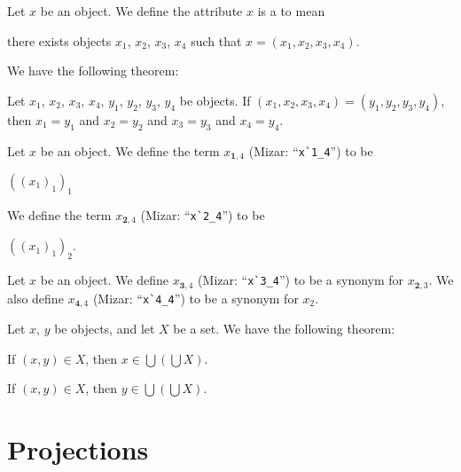 \documentclass{article}
\begin{document}
\begin{definition}
Let $x$ be an object. We define the attribute $x$ is a
 to mean
\begin{defn}
\item there exists objects $x_{1}$, $x_{2}$, $x_{3}$, $x_{4}$ such that $x=(x_{1},x_{2},x_{3},x_{4})$.
\end{defn}
\end{definition}



We have the following theorem:
\begin{thm}
\item\label{xtuple0:5} Let $x_{1}$, $x_{2}$, $x_{3}$, $x_{4}$, $y_{1}$, $y_{2}$, $y_{3}$, $y_{4}$
be objects. If $(x_{1},x_{2},x_{3},x_{4})=(y_{1},y_{2},y_{3},y_{4})$,
then $x_{1}=y_{1}$ and $x_{2}=y_{2}$ and $x_{3}=y_{3}$ and $x_{4}=y_{4}$.
\end{thm}

\begin{definition}
Let $x$ be an object. We define the term $x_{\mathbf{1},4}$ (Mizar: ``\verb#x`1_4#'') to be
\begin{defn}
\item $((x_{1})_{1})_{1}$
\end{defn}
We define the term $x_{\mathbf{2},4}$ (Mizar: ``\verb#x`2_4#'') to be
\begin{defn}
\item $((x_{1})_{1})_{2}$.
\end{defn}
\end{definition}

\begin{notation}
Let $x$ be an object. We define $x_{\mathbf{3},4}$ (Mizar: ``\verb#x`3_4#'') to be a synonym for $x_{\mathbf{2},3}$.
We also define $x_{\mathbf{4},4}$ (Mizar: ``\verb#x`4_4#'') to be a
synonym for $x_{2}$.
\end{notation}

Let $x$, $y$ be objects, and let $X$ be a set. We have the following theorem:
\begin{thm}
\item\label{xtuple0:6} If $(x,y)\in X$, then $x\in\bigcup(\bigcup X)$.
\item\label{xtuple0:7} If $(x,y)\in X$, then $y\in\bigcup(\bigcup X)$.
\end{thm}

\section{Projections}
\end{document}
